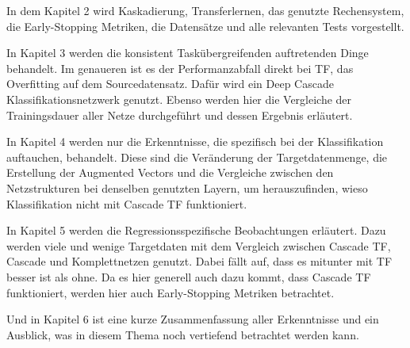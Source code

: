 In dem Kapitel 2 wird Kaskadierung, Transferlernen, das genutzte Rechensystem, die Early-Stopping Metriken, die Datensätze und alle 
relevanten Tests vorgestellt.

In Kapitel 3 werden die konsistent Taskübergreifenden auftretenden Dinge behandelt. Im genaueren ist es der Performanzabfall direkt bei TF, 
das Overfitting auf dem Sourcedatensatz. Dafür wird ein Deep Cascade Klassifikationsnetzwerk genutzt. 
Ebenso werden hier die Vergleiche der Trainingsdauer aller Netze durchgeführt und dessen Ergebnis erläutert. 

In Kapitel 4 werden nur die Erkenntnisse, die spezifisch bei der Klassifikation auftauchen, behandelt. Diese sind die Veränderung der 
Targetdatenmenge, die Erstellung der Augmented Vectors und die Vergleiche zwischen den Netzstrukturen bei denselben genutzten Layern, um 
herauszufinden, wieso Klassifikation nicht mit Cascade TF funktioniert. 

In Kapitel 5 werden die Regressionsspezifische Beobachtungen erläutert. Dazu werden viele und wenige Targetdaten mit dem Vergleich zwischen 
Cascade TF, Cascade und Komplettnetzen genutzt. Dabei fällt auf, dass es mitunter mit TF besser ist als ohne. Da es hier generell auch dazu 
kommt, dass Cascade TF funktioniert, werden hier auch Early-Stopping Metriken betrachtet. 

Und in Kapitel 6 ist eine kurze Zusammenfassung aller Erkenntnisse und ein Ausblick, was in diesem Thema noch vertiefend betrachtet werden kann. 
